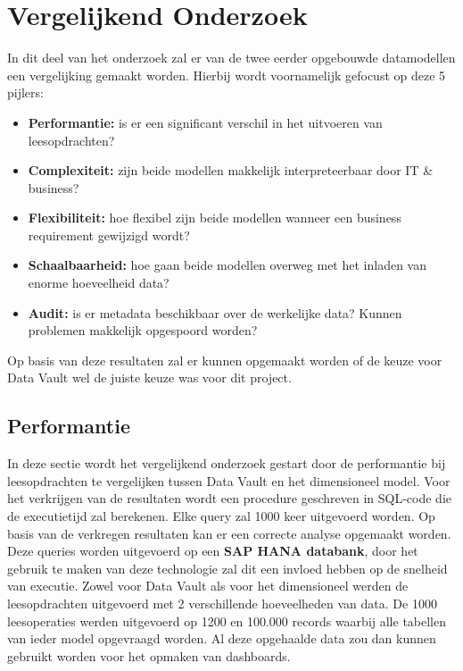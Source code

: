 
\chapter{Vergelijkend Onderzoek}
\label{ch:vergelijkendonderzoek}
In dit deel van het onderzoek zal er van de twee eerder opgebouwde datamodellen een vergelijking gemaakt worden. Hierbij wordt voornamelijk gefocust op deze 5 pijlers:

\begin{itemize}
	\item \textbf{Performantie:} is er een significant verschil in het uitvoeren van leesopdrachten?
	\item \textbf{Complexiteit:} zijn beide modellen makkelijk interpreteerbaar door IT \& business?
	\item \textbf{Flexibiliteit:} hoe flexibel zijn beide modellen wanneer een business requirement gewijzigd wordt?
	\item \textbf{Schaalbaarheid:} hoe gaan beide modellen overweg met het inladen van enorme hoeveelheid data?
	\item \textbf{Audit:} is er metadata beschikbaar over de werkelijke data? Kunnen problemen makkelijk opgespoord worden?
\end{itemize} 

Op basis van deze resultaten zal er kunnen opgemaakt worden of de keuze voor Data Vault wel de juiste keuze was voor dit project.

\section{Performantie}
In deze sectie wordt het vergelijkend onderzoek gestart door de performantie bij leesopdrachten te vergelijken tussen Data Vault en het dimensioneel model. Voor het verkrijgen van de resultaten wordt een procedure geschreven in SQL-code die de executietijd zal berekenen. Elke query zal 1000 keer uitgevoerd worden. Op basis van de verkregen resultaten kan er een correcte analyse opgemaakt worden. Deze queries worden uitgevoerd op een \textbf{SAP HANA databank}, door het gebruik te maken van deze technologie zal dit een invloed hebben op de snelheid van executie. Zowel voor Data Vault als voor het dimensioneel werden de leesopdrachten uitgevoerd met 2 verschillende hoeveelheden van data. De 1000 leesoperaties werden uitgevoerd op 1200 en 100.000 records waarbij alle tabellen van ieder model opgevraagd worden. Al deze opgehaalde data zou dan kunnen gebruikt worden voor het opmaken van dashboards.


